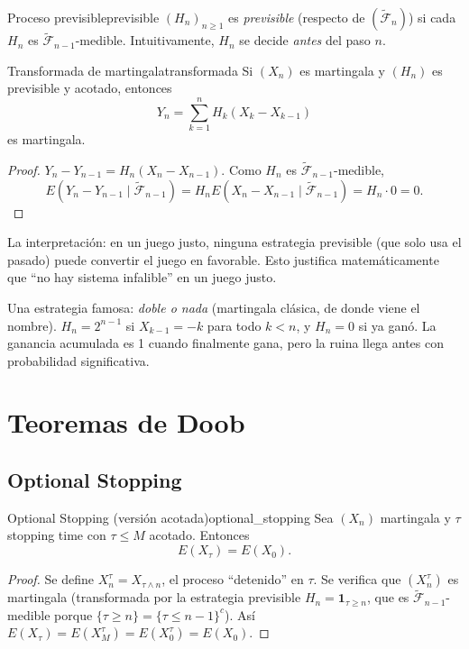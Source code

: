 \documentclass[11pt, a4paper]{article}
\begin{document}
\begin{definicion}{Proceso previsible}{previsible}
$(H_n)_{n \ge 1}$ es \emph{previsible} (respecto de $(\widetilde{\mathcal{F}}_n)$) si cada $H_n$ es
$\widetilde{\mathcal{F}}_{n-1}$-medible. Intuitivamente, $H_n$ se decide \emph{antes} del paso $n$.
\end{definicion}

\begin{proposicion}{Transformada de martingala}{transformada}
Si $(X_n)$ es martingala y $(H_n)$ es previsible y acotado, entonces
$$ Y_n = \sum_{k=1}^n H_k (X_k - X_{k-1}) $$
es martingala.
\end{proposicion}

\begin{proof}
$Y_n - Y_{n-1} = H_n (X_n - X_{n-1})$. Como $H_n$ es $\widetilde{\mathcal{F}}_{n-1}$-medible,
$$ E(Y_n - Y_{n-1} \mid \widetilde{\mathcal{F}}_{n-1}) = H_n E(X_n - X_{n-1} \mid
\widetilde{\mathcal{F}}_{n-1}) = H_n \cdot 0 = 0. $$
\end{proof}

\obs La interpretación: en un juego justo, ninguna estrategia previsible (que solo usa el
pasado) puede convertir el juego en favorable. Esto justifica matemáticamente que ``no hay
sistema infalible'' en un juego justo.

\obs Una estrategia famosa: \emph{doble o nada} (martingala clásica, de donde viene el nombre).
$H_n = 2^{n-1}$ si $X_{k-1} = -k$ para todo $k < n$, y $H_n = 0$ si ya ganó. La ganancia
acumulada es 1 cuando finalmente gana, pero la ruina llega antes con probabilidad significativa.

\newpage

\section{Teoremas de Doob}

\subsection{Optional Stopping}

\begin{teorema}{Optional Stopping (versión acotada)}{optional_stopping}
Sea $(X_n)$ martingala y $\tau$ stopping time con $\tau \le M$ acotado. Entonces
$$ E(X_\tau) = E(X_0). $$
\end{teorema}

\begin{proof}
Se define $X_n^\tau = X_{\tau \wedge n}$, el proceso ``detenido'' en $\tau$. Se verifica que
$(X_n^\tau)$ es martingala (transformada por la estrategia previsible
$H_n = \mathbf{1}_{\tau \ge n}$,
que es $\widetilde{\mathcal{F}}_{n-1}$-medible porque $\{\tau \ge n\} = \{\tau \le n-1\}^c$).
Así $E(X_\tau) = E(X_M^\tau) = E(X_0^\tau) = E(X_0)$.
\end{proof}
\end{document}
